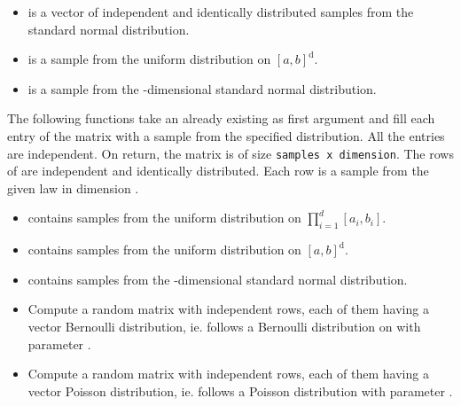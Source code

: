 \begin{itemize}
\item {}
  \sshortdescribe {} is a vector of independent and identically distributed
  samples from the standard normal distribution.

\item {}
  \sshortdescribe {} is a sample from the uniform distribution on $[a,
  b]^{\text{d}}$.

\item {}
  \sshortdescribe {} is a sample from the -dimensional
  standard normal distribution.

\end{itemize}

The following functions take an already existing \PnlMat\ptr  as
first argument and fill each entry of the matrix with a sample from the
specified distribution. All the entries are independent. On return, the matrix 
is of size \verb!samples x dimension!. The rows of  are independent
and identically distributed. Each row is a sample from the given law in
dimension .
\begin{itemize}
\item {}
  \sshortdescribe {} contains  samples from the uniform
  distribution on $\prod_{i=1}^d [a_i, b_i]$.

\item {}
  \sshortdescribe {} contains  samples from the uniform
  distribution on $[a, b]^{\text{d}}$.

\item {}
  \sshortdescribe {} contains  samples from the
  -dimensional standard normal distribution.

\item {}
  \sshortdescribe Compute a random matrix with independent rows, each of them
  having a vector Bernoulli distribution, ie.  follows a
  Bernoulli distribution on  with parameter .

\item {}
  \sshortdescribe Compute a random matrix with independent rows, each of them
  having a vector Poisson distribution, ie.  follows a
  Poisson distribution with parameter .
\end{itemize}

